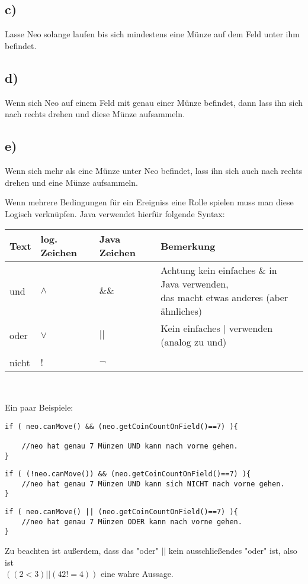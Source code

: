 	\subsection*{c)}
	Lasse Neo solange laufen bis sich mindestens eine Münze auf dem Feld unter ihm befindet.
	\subsection*{d)}
	Wenn sich Neo auf einem Feld mit genau einer Münze befindet, dann lass ihn sich nach rechts drehen und diese Münze aufsammeln.
	\subsection*{e)}
	Wenn sich mehr als eine Münze unter Neo befindet, lass ihn sich auch nach rechts drehen und eine Münze aufsammeln.


\begin{Infobox}
Wenn mehrere Bedingungen für ein Ereigniss eine Rolle spielen muss man diese Logisch verknüpfen. Java verwendet hierfür folgende Syntax:
\begin{center}
        \begin{tabular}{ l | l | l | l}
            Text & log. Zeichen & Java Zeichen &Bemerkung \\
            \hline
            und  &$\land$& $\&\&$& \minibox{Achtung kein einfaches \& in Java verwenden,\\ das macht etwas anderes (aber ähnliches)} \\
            oder  &$\lor$& $||$& Kein einfaches $|$ verwenden (analog zu und) \\
            & &  \\

            nicht & $!$&$\neg$ &\\
    \end{tabular}\\
\end{center}
Ein paar Beispiele:
\begin{lstlisting}
if ( neo.canMove() && (neo.getCoinCountOnField()==7) ){

	//neo hat genau 7 Münzen UND kann nach vorne gehen.
}
\end{lstlisting}

\begin{lstlisting}
if ( (!neo.canMove()) && (neo.getCoinCountOnField()==7) ){
	//neo hat genau 7 Münzen UND kann sich NICHT nach vorne gehen.
}
\end{lstlisting}

\begin{lstlisting}
if ( neo.canMove() || (neo.getCoinCountOnField()==7) ){
	//neo hat genau 7 Münzen ODER kann nach vorne gehen.
}
\end{lstlisting}
Zu beachten ist außerdem, dass das "oder" $||$ kein ausschließendes "oder" ist, also ist \\ $((2 < 3) || (42 != 4))$ eine wahre Aussage.
\end{Infobox}
